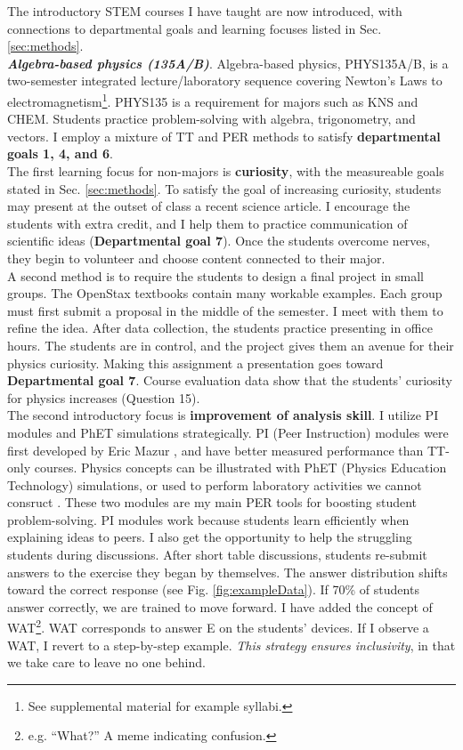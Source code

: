 \documentclass[../../../main.tex]{subfiles}
\begin{document}
The introductory STEM courses I have taught are now introduced, with connections to departmental goals and learning focuses listed in Sec. \ref{sec:methods}.
\\
\vspace{0.15cm}
\textbf{\textit{Algebra-based physics (135A/B)}}. Algebra-based physics, PHYS135A/B, is a two-semester integrated lecture/laboratory sequence covering Newton's Laws to electromagnetism\footnote{See supplemental material for example syllabi.}.  PHYS135 is a requirement for majors such as KNS and CHEM.  Students practice problem-solving with algebra, trigonometry, and vectors.  I employ a mixture of TT and PER methods to satisfy \textbf{departmental goals 1, 4, and 6}.
\\
\vspace{0.15cm}
The first learning focus for non-majors is \textbf{curiosity}, with the measureable goals stated in Sec. \ref{sec:methods}.  To satisfy the goal of increasing curiosity, students may present at the outset of class a recent science article.  I encourage the students with extra credit, and I help them to practice communication of scientific ideas (\textbf{Departmental goal 7}).  Once the students overcome nerves, they begin to volunteer and choose content connected to their major.
\\
\vspace{0.15cm}
A second method is to require the students to design a final project in small groups.  The OpenStax textbooks contain many workable examples.  Each group must first submit a proposal in the middle of the semester.  I meet with them to refine the idea.  After data collection, the students practice presenting in office hours.  The students are in control, and the project gives them an avenue for their physics curiosity.  Making this assignment a presentation goes toward \textbf{Departmental goal 7}.  Course evaluation data show that the students' curiosity for physics increases (Question 15).
\\
\vspace{0.15cm}
The second introductory focus is \textbf{improvement of analysis skill}.  I utilize PI modules and PhET simulations strategically.  PI (Peer Instruction) modules were first developed by Eric Mazur \cite{mazur2013peer}, and have better measured performance than TT-only courses.  Physics concepts can be illustrated with PhET (Physics Education Technology) simulations, or used to perform laboratory activities we cannot consruct \cite{phet}.  These two modules are my main PER tools for boosting student problem-solving.  PI modules work because students learn efficiently when explaining ideas to peers.  I also get the opportunity to help the struggling students during discussions.  After short table discussions, students re-submit answers to the exercise they began by themselves.  The answer distribution shifts toward the correct response (see Fig. \ref{fig:exampleData}).  If 70\% of students answer correctly, we are trained to move forward.  I have added the concept of WAT\footnote{e.g. ``What?'' A meme indicating confusion.}.  WAT corresponds to answer E on the students' devices.  If I observe a WAT, I revert to a step-by-step example.  \textit{This strategy ensures inclusivity}, in that we take care to leave no one behind.
\end{document}
